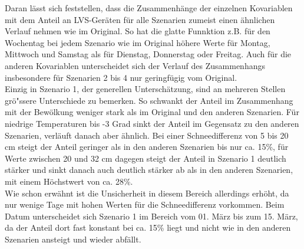 \documentclass[12pt]{scrreprt}
\begin{document}
\noindent Daran lässt sich feststellen, dass die Zusammenhänge der einzelnen Kovariablen mit dem Anteil an LVS-Geräten für alle Szenarien zumeist einen ähnlichen Verlauf nehmen wie im Original. So hat die glatte Funnktion z.B. für den Wochentag bei jedem Szenario wie im Original höhere Werte für Montag, Mittwoch und Samstag als für Dienstag, Donnerstag oder Freitag. Auch für die anderen Kovariablen unterscheidet sich der Verlauf des Zusammenhangs insbesondere für Szenarien 2 bis 4 nur geringfügig vom Original. \\
Einzig in Szenario 1, der generellen Unterschätzung, sind an mehreren Stellen grö"ssere Unterschiede zu bemerken. So schwankt der Anteil im Zusammenhang mit der Bewölkung  weniger stark als im Original und den anderen Szenarien. Für niedrige Temperaturen bis -3 Grad sinkt der Anteil im Gegensatz zu den anderen Szenarien, verläuft danach aber ähnlich. Bei einer Schneedifferenz von 5 bis 20 cm steigt der Anteil geringer als in den anderen Szenarien bis nur ca. 15\%, für Werte zwischen 20 und 32 cm dagegen steigt der Anteil in Szenario 1 deutlich stärker und sinkt danach auch deutlich stärker ab als in den anderen Szenarien, mit einem Höchstwert von ca. 28\%. \\
Wie schon erwähnt ist die Unsicherheit in diesem Bereich allerdings erhöht, da nur wenige Tage mit hohen Werten für die Schneedifferenz vorkommen. Beim Datum unterscheidet sich Szenario 1 im Bereich vom 01. März bis zum 15. März, da der Anteil dort fast konstant bei ca. 15\% liegt und nicht wie in den anderen Szenarien ansteigt und wieder abfällt.
\end{document}
